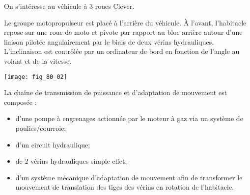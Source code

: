 \normaltrue \difficilefalse \tdifficilefalse
\correctionfalse

\setcounter{question}{0}
\ifcorrection
\else
{}
\fi




On s'intéresse au véhicule à 3 roues Clever.

\ifprof
\else


 Le groupe motopropulseur est placé à l'arrière du véhicule. À l’avant, l’habitacle repose sur une roue de moto et pivote par rapport au bloc arrière autour d’une liaison pilotée angulairement par le biais de deux vérins hydrauliques. L'inclinaison est contrôlée par un ordinateur de bord en fonction de l'angle au volant et de la vitesse. 

\begin{center}
\texttt{[image: fig\_80\_02]}
\end{center}


La chaîne de transmission de puissance et d’adaptation de mouvement est composée :
\begin{itemize}
\item d’une pompe à engrenages actionnée par le moteur à gaz via un système de poulies/courroie;
\item d’un circuit hydraulique;
\item de 2 vérins hydrauliques simple effet;
\item d’un système mécanique d’adaptation de mouvement afin de transformer le mouvement de translation des tiges des vérins en rotation de l’habitacle.
\end{itemize}


